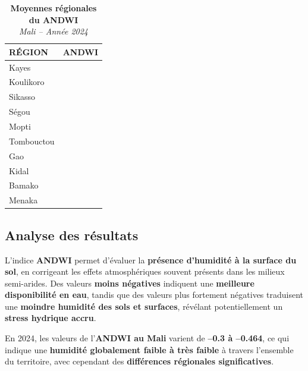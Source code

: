 \documentclass[
]{book}
\begin{document}
\begin{table}[!t]
\caption*{
{\large \textbf{Moyennes régionales du ANDWI}} \\ 
{\small \emph{Mali -- Année 2024}}
} 
\fontsize{12.0pt}{14.4pt}\selectfont
\begin{tabular*}{\linewidth}{@{\extracolsep{\fill}}lr}
\toprule
{RÉGION} & {ANDWI} \\ 
\midrule\addlinespace[2.5pt]
Kayes & {\cellcolor[HTML]{C3DAEE}{\textcolor[HTML]{000000}{-0.427}}} \\ 
Koulikoro & {\cellcolor[HTML]{C3DAEE}{\textcolor[HTML]{000000}{-0.427}}} \\ 
Sikasso & {\cellcolor[HTML]{F7FBFF}{\textcolor[HTML]{000000}{-0.464}}} \\ 
Ségou & {\cellcolor[HTML]{7DB7DA}{\textcolor[HTML]{000000}{-0.399}}} \\ 
Mopti & {\cellcolor[HTML]{4493C7}{\textcolor[HTML]{FFFFFF}{-0.376}}} \\ 
Tombouctou & {\cellcolor[HTML]{08306B}{\textcolor[HTML]{FFFFFF}{-0.322}}} \\ 
Gao & {\cellcolor[HTML]{1963AA}{\textcolor[HTML]{FFFFFF}{-0.350}}} \\ 
Kidal & {\cellcolor[HTML]{094083}{\textcolor[HTML]{FFFFFF}{-0.331}}} \\ 
Bamako & {\cellcolor[HTML]{093D7E}{\textcolor[HTML]{FFFFFF}{-0.329}}} \\ 
Menaka & {\cellcolor[HTML]{09468C}{\textcolor[HTML]{FFFFFF}{-0.334}}} \\ 
\bottomrule
\end{tabular*}
\end{table}

\subsection{Analyse des résultats}\label{analyse-des-ruxe9sultats-8}

L'indice \textbf{ANDWI} permet d'évaluer la \textbf{présence d'humidité à la surface du sol}, en corrigeant les effets atmosphériques souvent présents dans les milieux semi-arides. Des valeurs \textbf{moins négatives} indiquent une \textbf{meilleure disponibilité en eau}, tandis que des valeurs plus fortement négatives traduisent une \textbf{moindre humidité des sols et surfaces}, révélant potentiellement un \textbf{stress hydrique accru}.

En 2024, les valeurs de l'\textbf{ANDWI au Mali} varient de \textbf{--0.3 à --0.464}, ce qui indique une \textbf{humidité globalement faible à très faible} à travers l'ensemble du territoire, avec cependant des \textbf{différences régionales significatives}.
\end{document}
